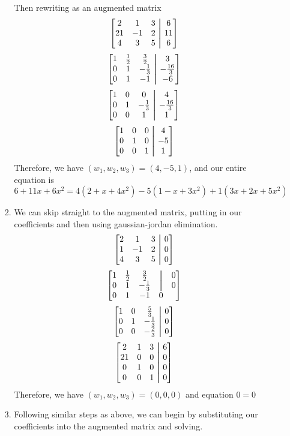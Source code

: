 \documentclass[11pt, letterpaper, twoside]{article}
\newcommand\aug{\fboxsep=-\fboxrule\!\!\!\fbox{\strut}\!\!\!} %
\begin{document}
\begin{enumerate}
\begin{enumerate}[label=\alph*)]
\begin{enumerate}[label=\roman*)]
Then rewriting as an augmented matrix
\[\begin{bmatrix}
    2&1&3&\aug&6\\2 
    1&-1&2&\aug&11\\
    4&3&5&\aug&6
\end{bmatrix}\]
\[\begin{bmatrix}
1 & \frac{1}{2}&\frac{3}{2}&\aug&3\\
0&1&-\frac{1}{3}&\aug&-\frac{16}{3}\\
0&1&-1&\aug&-6
\end{bmatrix}\]
\[\begin{bmatrix}
1&0&0&\aug&4\\
0&1&-\frac{1}{3}&\aug&-\frac{16}{3}\\
0&0&1&\aug&1
\end{bmatrix}\]
\[\begin{bmatrix}
1&0&0&\aug&4\\
0&1&0&\aug&-5\\
0&0&1&\aug&1
\end{bmatrix}\]
Therefore, we have \((w_1, w_2, w_3)=(4, -5, 1)\), and our entire equation is
\[6+11x+6x^2=4(2+x+4x^2)-5(1-x+3x^2)+1(3x+2x+5x^2)\]
\item We can skip straight to the augmented matrix, putting in our coefficients and then using gaussian-jordan elimination.
\[\begin{bmatrix}
    2&1&3&\aug&0\\
    1&-1&2&\aug&0\\
    4&3&5&\aug&0
\end{bmatrix}\]
\[\begin{bmatrix}
1&\frac{1}{2}&\frac{3}{2}&\aug&0\\
0&1&-\frac{1}{3}&\aug&0\\
0&1&-1&0
\end{bmatrix}\]
\[\begin{bmatrix}
1&0&\frac{5}{3}&\aug&0\\
0&1&-\frac{1}{3}&\aug&0\\
0&0&-\frac{2}{3}&\aug&0
\end{bmatrix}\]
\[\begin{bmatrix}
    2&1&3&\aug&6\\2 
1&0&0&\aug&0\\
0&1&0&\aug&0\\
0&0&1&\aug&0\\
\end{bmatrix}\]
Therefore, we have \((w_1, w_2, w_3)=(0, 0, 0)\) and equation \(0=0\)
\item Following similar steps as above, we can begin by substituting our coefficients into the augmented matrix and solving.

\end{enumerate}
\end{enumerate}
\end{enumerate}
\end{document}
